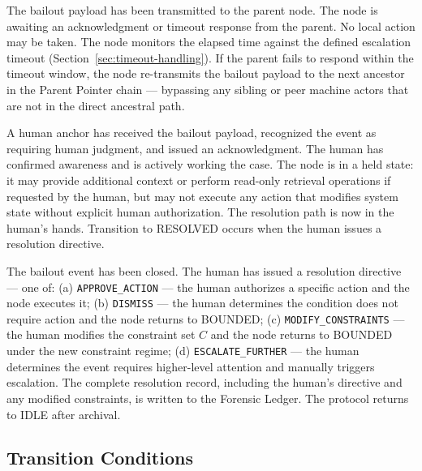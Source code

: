 \begin{definition}[ESCALATING]
\label{def:state-escalating}
The bailout payload has been transmitted to the parent node. The node is awaiting an acknowledgment or timeout response from the parent. No local action may be taken. The node monitors the elapsed time against the defined escalation timeout (Section~\ref{sec:timeout-handling}). If the parent fails to respond within the timeout window, the node re-transmits the bailout payload to the next ancestor in the Parent Pointer chain — bypassing any sibling or peer machine actors that are not in the direct ancestral path.
\end{definition}

\begin{definition}
\label{def:state-human-acknowledged}
A human anchor has received the bailout payload, recognized the event as requiring human judgment, and issued an acknowledgment. The human has confirmed awareness and is actively working the case. The node is in a held state: it may provide additional context or perform read-only retrieval operations if requested by the human, but may not execute any action that modifies system state without explicit human authorization. The resolution path is now in the human's hands. Transition to RESOLVED occurs when the human issues a resolution directive.
\end{definition}

\begin{definition}[RESOLVED]
\label{def:state-resolved}
The bailout event has been closed. The human has issued a resolution directive — one of: (a) \texttt{APPROVE\_ACTION} — the human authorizes a specific action and the node executes it; (b) \texttt{DISMISS} — the human determines the condition does not require action and the node returns to BOUNDED; (c) \texttt{MODIFY\_CONSTRAINTS} — the human modifies the constraint set $C$ and the node returns to BOUNDED under the new constraint regime; (d) \texttt{ESCALATE\_FURTHER} — the human determines the event requires higher-level attention and manually triggers escalation. The complete resolution record, including the human's directive and any modified constraints, is written to the Forensic Ledger. The protocol returns to IDLE after archival.
\end{definition}

\subsection{Transition Conditions}
\label{sec:transition-conditions}

